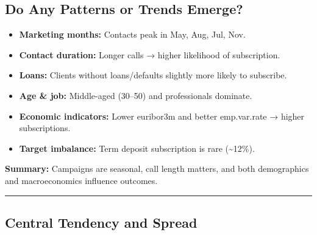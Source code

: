\documentclass[
]{article}
\providecommand{\tightlist}{%
  \setlength{\itemsep}{0pt}\setlength{\parskip}{0pt}}
\begin{document}
\subsection{Do Any Patterns or Trends
Emerge?}\label{do-any-patterns-or-trends-emerge}

\begin{itemize}
\tightlist
\item
  \textbf{Marketing months:} Contacts peak in May, Aug, Jul, Nov.\\
\item
  \textbf{Contact duration:} Longer calls → higher likelihood of
  subscription.\\
\item
  \textbf{Loans:} Clients without loans/defaults slightly more likely to
  subscribe.\\
\item
  \textbf{Age \& job:} Middle-aged (30--50) and professionals
  dominate.\\
\item
  \textbf{Economic indicators:} Lower euribor3m and better emp.var.rate
  → higher subscriptions.\\
\item
  \textbf{Target imbalance:} Term deposit subscription is rare
  (\textasciitilde12\%).
\end{itemize}

\textbf{Summary:} Campaigns are seasonal, call length matters, and both
demographics and macroeconomics influence outcomes.

\begin{center}\rule{0.5\linewidth}{0.5pt}\end{center}

\subsection{Central Tendency and
Spread}\label{central-tendency-and-spread}
\end{document}
